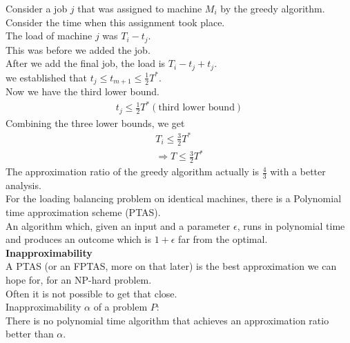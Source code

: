\documentclass[onecolumn]{report}
\begin{document}
\noindent
Consider a job $j$ that was assigned to machine $M_i$ by the greedy algorithm. Consider the time when this assignment took place.\\
\indent The load of machine $j$ was $T_i-t_j$.\\
\indent This was before we added the job.\\
\indent After we add the final job, the load is $T_i-t_j+t_j$.\\
\indent we established that $t_j \leq t_{m+1} \leq \frac{1}{2} T^*$.\\
\indent Now we have the third lower bound.\\
\begin{align*}
    t_j \leq \frac{1}{2} T^* (\text{third lower bound})
\end{align*}
\indent Combining the three lower bounds, we get
\begin{align*}
    T_i \leq \frac{3}{2} T^* \\
    \Rightarrow T \leq \frac{3}{2} T^*
\end{align*}
The approximation ratio of the greedy algorithm actually is $\frac{4}{3}$ with a better analysis.\\
For the loading balancing problem on identical machines, there is a Polynomial time approximation scheme (PTAS).\\
\indent An algorithm which, given an input and a parameter $\epsilon$, runs in polynomial time and produces an outcome which is $1+\epsilon$ far from the optimal.\\
\noindent
\textbf{Inapproximability}\\
A PTAS (or an FPTAS, more on that later) is the best approximation we can hope for, for an NP-hard problem.\\
Often it is not possible to get that close.\\
\indent Inapproximability $\alpha$ of a problem $P$:\\
\indent \indent There is no polynomial time algorithm that achieves an approximation ratio better than $\alpha$.\\
\end{document}
